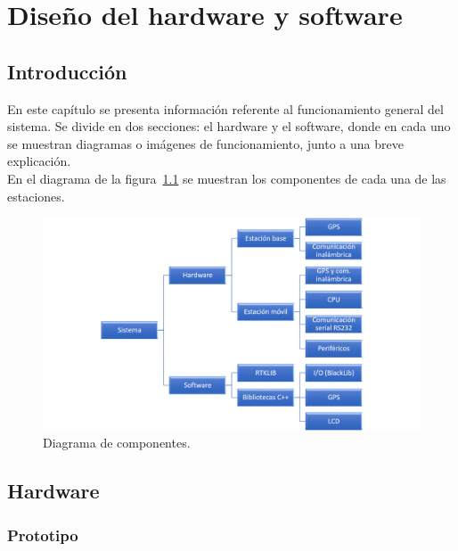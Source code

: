 
\chapter{Diseño del hardware y software}
\label{Chap:DisHard} %


\section{Introducción}

En este capítulo se presenta información referente al funcionamiento general del sistema. Se divide en dos secciones: el hardware y el software, donde en cada uno se muestran diagramas o imágenes de funcionamiento, junto a una breve explicación.\\

En el diagrama de la figura~\ref{fig:diagcomp} se muestran los componentes de cada una de las estaciones.

\begin{figure}[H]
\centering
\includegraphics[scale=0.47]{Figures/DiagramaFinal}
\caption[Diagrama de componentes.]{Diagrama de componentes.}
\label{fig:diagcomp}
\end{figure}

\section{Hardware}

\subsection{Prototipo}

